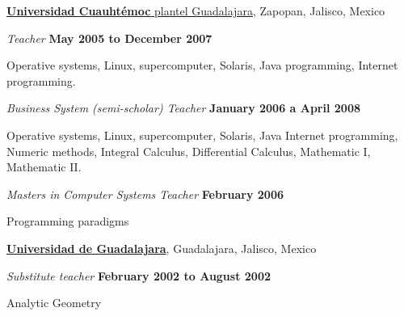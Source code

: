 \blankline

\href{https://www.ucg.edu.mx/}{\textbf{Universidad Cuauhtémoc} plantel Guadalajara},
Zapopan, Jalisco, Mexico 
\begin{outerlist}
\item[] \textit{Teacher}%
    \hfill \textbf{May 2005 to December 2007}
    \begin{innerlist}
        \item Operative systems, Linux, supercomputer, Solaris, Java
         programming, Internet programming.
    \end{innerlist}
\item[] \textit{Business System (semi-scholar) Teacher }%
    \hfill \textbf{January 2006 a April 2008}
    \begin{innerlist}
        \item Operative systems, Linux, supercomputer, Solaris, Java
         Internet programming, Numeric methods, Integral Calculus, 
         Differential Calculus, Mathematic I, Mathematic II.
    \end{innerlist}
\item[] \textit{Masters in Computer Systems Teacher}%
    \hfill \textbf{February 2006}
    \begin{innerlist}
        \item Programming paradigms
    \end{innerlist}
\end{outerlist}

\blankline

\href{http://www.udg.mx/}{\textbf{Universidad de Guadalajara}},
Guadalajara, Jalisco, Mexico 
\begin{outerlist}
\item[] \textit{Substitute teacher}%
    \hfill \textbf{February 2002 to August 2002}
    \begin{innerlist}
        \item Analytic Geometry
    \end{innerlist}
\end{outerlist}
